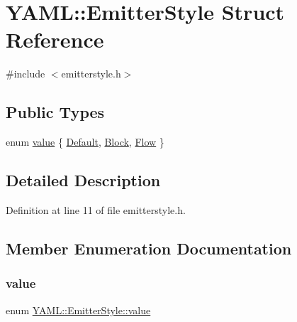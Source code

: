 \hypertarget{struct_y_a_m_l_1_1_emitter_style}{}\section{Y\+A\+ML\+::Emitter\+Style Struct Reference}
\label{struct_y_a_m_l_1_1_emitter_style}


{\ttfamily \#include $<$emitterstyle.\+h$>$}

\subsection*{Public Types}
\begin{DoxyCompactItemize}
\item 
enum \mbox{\hyperlink{struct_y_a_m_l_1_1_emitter_style_ae86640662c85ce6062a37f9636b6959f}{value}} \{ \mbox{\hyperlink{struct_y_a_m_l_1_1_emitter_style_ae86640662c85ce6062a37f9636b6959facab9a586c2c5345fe15ae0469eaebcac}{Default}}, 
\mbox{\hyperlink{struct_y_a_m_l_1_1_emitter_style_ae86640662c85ce6062a37f9636b6959faa8694c8bd3caf4205f2049f2128732aa}{Block}}, 
\mbox{\hyperlink{struct_y_a_m_l_1_1_emitter_style_ae86640662c85ce6062a37f9636b6959fa4b1f145042fd02a2c7cccce4d2173759}{Flow}}
 \}
\end{DoxyCompactItemize}


\subsection{Detailed Description}


Definition at line 11 of file emitterstyle.\+h.



\subsection{Member Enumeration Documentation}
\mbox{\label{struct_y_a_m_l_1_1_emitter_style_ae86640662c85ce6062a37f9636b6959f}} 
\subsubsection{\texorpdfstring{value}{value}}
{\footnotesize\ttfamily enum \mbox{\hyperlink{struct_y_a_m_l_1_1_emitter_style_ae86640662c85ce6062a37f9636b6959f}{Y\+A\+M\+L\+::\+Emitter\+Style\+::value}}}

